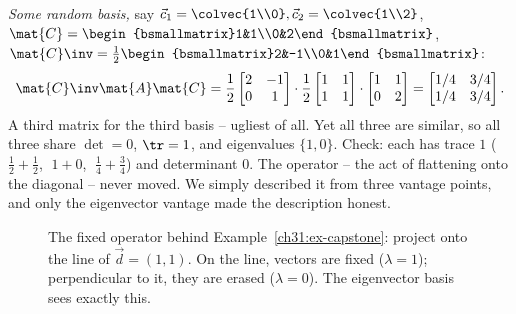 \begin{example}
\emph{Some random basis,} say $\vec{c}_1=\colvec{1\\0},\vec{c}_2=\colvec{1\\2}$,
$\mat{C}=\begin{bsmallmatrix}1&1\\0&2\end{bsmallmatrix}$,
$\mat{C}\inv=\tfrac12\begin{bsmallmatrix}2&-1\\0&1\end{bsmallmatrix}$:
\[
  \mat{C}\inv\mat{A}\mat{C}
  = \frac12\begin{bmatrix}2&-1\\0&1\end{bmatrix}\cdot\frac12\begin{bmatrix}1&1\\1&1\end{bmatrix}\cdot\begin{bmatrix}1&1\\0&2\end{bmatrix}
  = \begin{bmatrix}1/4 & 3/4\\ 1/4 & 3/4\end{bmatrix}.
\]
A third matrix for the third basis -- ugliest of all. Yet all three are similar,
so all three share $\det=0$, $\tr=1$, and eigenvalues $\{1,0\}$. Check: each has
trace $1$ ($\tfrac12+\tfrac12$, $\;1+0$, $\;\tfrac14+\tfrac34$) and determinant $0$.
The operator -- the act of flattening onto the diagonal -- never moved. We simply
described it from three vantage points, and only the eigenvector vantage made the
description honest.
\end{example}

\begin{figure}[H]
\centering
{}
\caption{The fixed operator behind Example~\ref{ch31:ex-capstone}: project onto the
line of $\vec{d}=(1,1)$. On the line, vectors are fixed ($\lambda=1$); perpendicular
to it, they are erased ($\lambda=0$). The eigenvector basis sees exactly this.}
\label{ch31:fig-capstone}
\end{figure}

